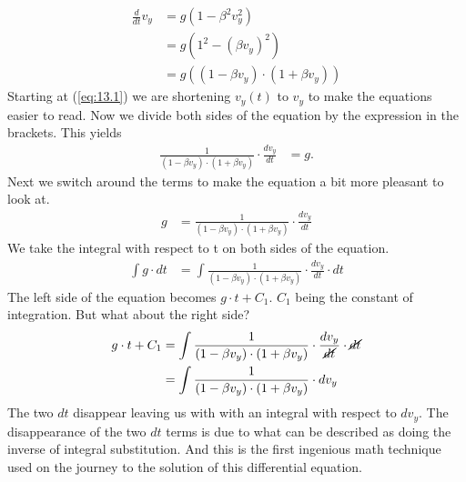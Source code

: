 \documentclass[paper=a4, fontsize=11pt]{scrartcl} %
\numberwithin{equation}{section} %
\numberwithin{figure}{section} %
\numberwithin{table}{section} %
\begin{document}
\begin{align} \label{eq:13.1}
\frac{d}{dt} v_y &= g \left(1 - \beta^2 v_y^2\right) \\
                    &= g \left(1^2 - (\beta v_y)^2\right) \\
                    &= g \left((1 - \beta v_y)\cdot (1 + \beta v_y)\right)
\end{align}
Starting at (\ref{eq:13.1}) we are shortening $v_y(t)$ to $v_y$ to make the equations easier to read. Now we divide both sides of the equation by the expression in the brackets. This yields
\begin{align} \label{eq:13.2}
\frac{1}{(1 - \beta v_y)\cdot (1 + \beta v_y)} \cdot \frac{d v_y}{dt}  &= g.
\end{align}
Next we switch around the terms to make the equation a bit more pleasant to look at.
\begin{align} \label{eq:14}
g  &= \frac{1}{(1 - \beta v_y)\cdot (1 + \beta v_y)} \cdot \frac{d v_y}{dt}
\end{align}
We take the integral with respect to t on both sides of the equation.
\begin{align} \label{eq:15}
\int g \cdot dt &= \int \frac{1}{(1 - \beta v_y)\cdot (1 + \beta v_y)} \cdot \frac{d v_y}{dt} \cdot dt
\end{align}
The left side of the equation becomes $g \cdot t + C_1$. $C_1$ being the constant of integration.
But what about the right side?
\begin{align} 
g \cdot t + C_1 &= \int \frac{1}{(1 - \beta v_y)\cdot (1 + \beta v_y)} \cdot \frac{d v_y}{\cancel{dt}} \cdot \cancel{dt} \label{eq:16}\\
                &= \int \frac{1}{(1 - \beta v_y)\cdot (1 + \beta v_y)} \cdot d v_y \label{eq:17}
\end{align}
The two $dt$ disappear leaving us with with an integral with respect to $dv_y$.
The disappearance of the two $dt$ terms is due to what can be described as doing the inverse of integral substitution. And this is the first ingenious math technique used on the journey to the solution of this differential equation.
\vspace{\baselineskip}
\end{document}
